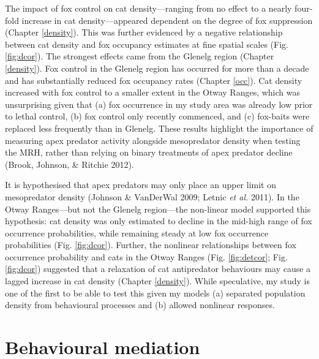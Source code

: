 \documentclass[11pt,a4paper,titlepage,twoside,openright]{style/unimelbthesis}
\begin{document}
\begin{mainmatter}
The impact of fox control on cat density---ranging from no effect to a nearly four-fold increase in cat density---appeared dependent on the degree of fox suppression (Chapter \ref{density}). This was further evidenced by a negative relationship between cat density and fox occupancy estimates at fine spatial scales (Fig. \ref{fig:dcor}). The strongest effects came from the Glenelg region (Chapter \ref{density}). Fox control in the Glenelg region has occurred for more than a decade and has substantially reduced fox occupancy rates (Chapter \ref{occ}). Cat density increased with fox control to a smaller extent in the Otway Ranges, which was unsurprising given that (a) fox occurrence in my study area was already low prior to lethal control, (b) fox control only recently commenced, and (c) fox-baits were replaced less frequently than in Glenelg. These results highlight the importance of measuring apex predator activity alongside mesopredator density when testing the MRH, rather than relying on binary treatments of apex predator decline (Brook, Johnson, \& Ritchie 2012).

It is hypothesised that apex predators may only place an upper limit on mesopredator density (Johnson \& VanDerWal 2009; Letnic \emph{et al.} 2011). In the Otway Ranges---but not the Glenelg region---the non-linear model supported this hypothesis: cat density was only estimated to decline in the mid-high range of fox occurrence probabilities, while remaining steady at low fox occurrence probabilities (Fig. \ref{fig:dcor}). Further, the nonlinear relationships between fox occurrence probability and cats in the Otway Ranges (Fig. \ref{fig:detcor}; Fig. \ref{fig:dcor}) suggested that a relaxation of cat antipredator behaviours may cause a lagged increase in cat density (Chapter \ref{density}). While speculative, my study is one of the first to be able to test this given my models (a) separated population density from behavioural processes and (b) allowed nonlinear responses.

\hypertarget{behavioural-mediation}{%
\section{Behavioural mediation}\label{behavioural-mediation}}


\end{mainmatter}
\end{document}
